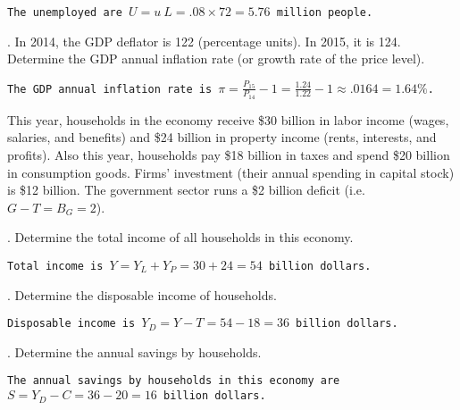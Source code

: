 \documentclass[12pt]{article}
\begin{document}
\vspace{10pt}


\texttt{The unemployed are $U = u \ L = .08 \times 72 = 5.76$ million people.}

\vspace{12pt}

. In 2014, the GDP deflator is 122 (percentage units).  In 2015, it is 124.  Determine the GDP annual inflation rate (or growth rate of the price level). 

\vspace{10pt}


\texttt{The GDP annual inflation rate is  $\pi = \frac{P_{15}}{P_{14}} - 1 = \frac{1.24}{1.22} - 1 \approx .0164 = 1.64\%$.}

\vspace{12pt}



\noindent This year, households in the economy receive \$30 billion in labor income (wages, salaries, and benefits) and \$24 billion in property income (rents, interests, and profits).  Also this year, households pay \$18 billion in taxes and spend \$20 billion in consumption goods.  Firms' investment (their annual spending in capital stock) is \$12 billion. The government sector runs a \$2 billion deficit (i.e. $G-T = B_G = 2$).  

\vspace{10pt}

. Determine the total income of all households in this economy.

\vspace{10pt}

\texttt{Total income is $Y = Y_L + Y_P = 30 + 24 = 54$ billion dollars.}

. Determine the disposable income of households.

\vspace{10pt}

\texttt{Disposable income is $Y_D = Y - T = 54 - 18 = 36$ billion dollars.}


\vspace{12pt}

. Determine the annual savings by households.

\vspace{10pt}

\texttt{The annual savings by households in this economy are $S = Y_D - C = 36 - 20 = 16$ billion dollars.}

\vspace{12pt}
\end{document}
